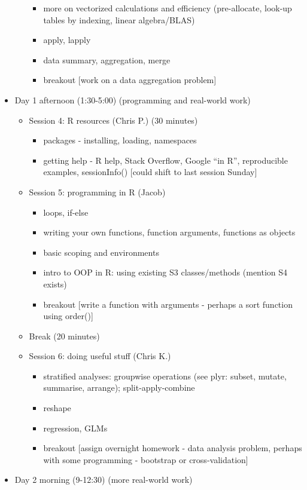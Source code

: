 \documentclass[12pt]{article}\usepackage{graphicx, color}
\begin{document}
\begin{itemize}
\begin{itemize}
\begin{itemize}
\item more on vectorized calculations and efficiency (pre-allocate, look-up
tables by indexing, linear algebra/BLAS)
\item apply, lapply
\item data summary, aggregation, merge
\item breakout {[}work on a data aggregation problem{]}
\end{itemize}
\end{itemize}
\item Day 1 afternoon (1:30-5:00) (programming and real-world work)

\begin{itemize}
\item Session 4: R resources (Chris P.) (30 minutes)

\begin{itemize}
\item packages - installing, loading, namespaces
\item getting help - R help, Stack Overflow, Google ``in R'', reproducible
examples, sessionInfo() {[}could shift to last session Sunday{]}
\end{itemize}
\item Session 5: programming in R (Jacob)

\begin{itemize}
\item loops, if-else
\item writing your own functions, function arguments, functions as objects
\item basic scoping and environments
\item intro to OOP in R: using existing S3 classes/methods (mention S4 exists)
\item breakout {[}write a function with arguments - perhaps a sort function
using order(){]}
\end{itemize}
\item Break (20 minutes)
\item Session 6: doing useful stuff (Chris K.)

\begin{itemize}
\item stratified analyses: groupwise operations (see plyr: subset, mutate,
summarise, arrange); split-apply-combine
\item reshape
\item regression, GLMs
\item breakout {[}assign overnight homework - data analysis problem, perhaps
with some programming - bootstrap or cross-validation{]}
\end{itemize}
\end{itemize}
\item Day 2 morning (9-12:30) (more real-world work)


\end{itemize}
\end{document}
